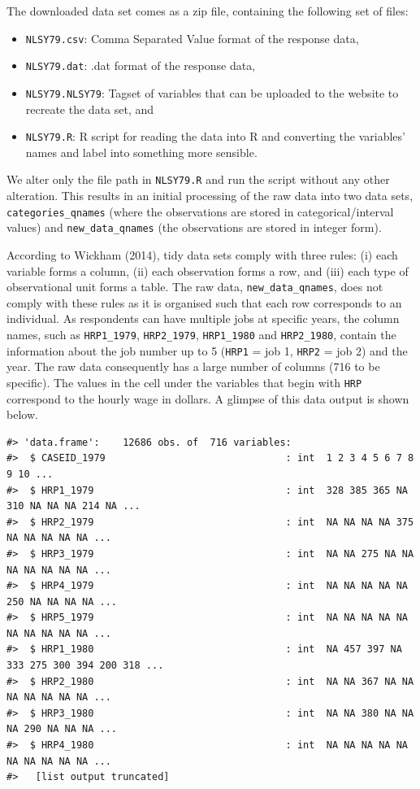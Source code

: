 \documentclass{article}
\providecommand{\tightlist}{%
  \setlength{\itemsep}{0pt}\setlength{\parskip}{0pt}}
\begin{document}
The downloaded data set comes as a zip file, containing the following set of files:

\begin{itemize}
\tightlist
\item
  \texttt{NLSY79.csv}: Comma Separated Value format of the response data,
\item
  \texttt{NLSY79.dat}: .dat format of the response data,
\item
  \texttt{NLSY79.NLSY79}: Tagset of variables that can be uploaded to the website to recreate the data set, and
\item
  \texttt{NLSY79.R}: R script for reading the data into R and converting the variables' names and label into something more sensible.
\end{itemize}

We alter only the file path in \texttt{NLSY79.R} and run the script without any other alteration. This results in an initial processing of the raw data into two data sets, \texttt{categories\_qnames} (where the observations are stored in categorical/interval values) and \texttt{new\_data\_qnames} (the observations are stored in integer form).

According to Wickham (2014), tidy data sets comply with three rules: (i) each variable forms a column, (ii) each observation forms a row, and (iii) each type of observational unit forms a table. The raw data, \texttt{new\_data\_qnames}, does not comply with these rules as it is organised such that each row corresponds to an individual. As respondents can have multiple jobs at specific years, the column names, such as \texttt{HRP1\_1979}, \texttt{HRP2\_1979}, \texttt{HRP1\_1980} and \texttt{HRP2\_1980}, contain the information about the job number up to 5 (\texttt{HRP1} = job 1, \texttt{HRP2} = job 2) and the year. The raw data consequently has a large number of columns (716 to be specific). The values in the cell under the variables that begin with \texttt{HRP} correspond to the hourly wage in dollars. A glimpse of this data output is shown below.

\begin{verbatim}
#> 'data.frame':    12686 obs. of  716 variables:
#>  $ CASEID_1979                               : int  1 2 3 4 5 6 7 8 9 10 ...
#>  $ HRP1_1979                                 : int  328 385 365 NA 310 NA NA NA 214 NA ...
#>  $ HRP2_1979                                 : int  NA NA NA NA 375 NA NA NA NA NA ...
#>  $ HRP3_1979                                 : int  NA NA 275 NA NA NA NA NA NA NA ...
#>  $ HRP4_1979                                 : int  NA NA NA NA NA 250 NA NA NA NA ...
#>  $ HRP5_1979                                 : int  NA NA NA NA NA NA NA NA NA NA ...
#>  $ HRP1_1980                                 : int  NA 457 397 NA 333 275 300 394 200 318 ...
#>  $ HRP2_1980                                 : int  NA NA 367 NA NA NA NA NA NA NA ...
#>  $ HRP3_1980                                 : int  NA NA 380 NA NA NA 290 NA NA NA ...
#>  $ HRP4_1980                                 : int  NA NA NA NA NA NA NA NA NA NA ...
#>   [list output truncated]
\end{verbatim}
\end{document}
